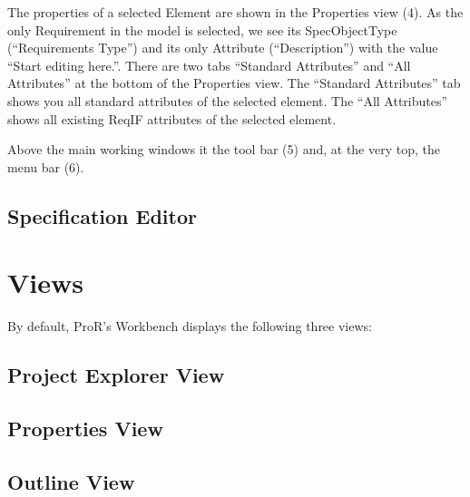 The properties of a selected Element are shown in the Properties view
(4).  As the only Requirement in the model is selected, we see its
SpecObjectType (``Requirements Type'') and its only Attribute
(``Description'') with the value ``Start editing here.''.  There are two
tabs ``Standard Attributes'' and ``All Attributes'' at the bottom of the
Properties view.  \marginpar{*****} The ``Standard Attributes'' tab shows you all standard
attributes of the selected element.  The ``All Attributes'' shows all
existing ReqIF attributes of the selected element.

Above the main working windows it the tool bar (5) and, at the very top, the menu bar (6).

\subsection{Specification Editor}

\section{Views}

By default, ProR's Workbench displays the following three views:

\subsection{Project Explorer View}

\subsection{Properties View}

\subsection{Outline View}

